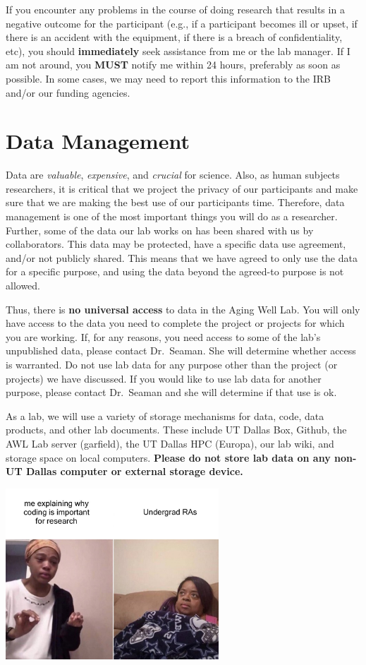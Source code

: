 \documentclass[]{book}
\begin{document}
If you encounter any problems in the course of doing research that results in a negative outcome for the participant (e.g., if a participant becomes ill or upset, if there is an accident with the equipment, if there is a breach of confidentiality, etc), you should \textbf{immediately} seek assistance from me or the lab manager. If I am not around, you \textbf{MUST} notify me within 24 hours, preferably as soon as possible. In some cases, we may need to report this information to the IRB and/or our funding agencies.

\hypertarget{data-management}{%
\chapter{Data Management}\label{data-management}}

Data are \emph{valuable}, \emph{expensive}, and \emph{crucial} for science. Also, as human subjects researchers, it is critical that we project the privacy of our participants and make sure that we are making the best use of our participants time. Therefore, data management is one of the most important things you will do as a researcher. Further, some of the data our lab works on has been shared with us by collaborators. This data may be protected, have a specific data use agreement, and/or not publicly shared. This means that we have agreed to only use the data for a specific purpose, and using the data beyond the agreed-to purpose is not allowed.

Thus, there is \textbf{no universal access} to data in the Aging Well Lab. You will only have access to the data you need to complete the project or projects for which you are working. If, for any reasons, you need access to some of the lab's unpublished data, please contact Dr.~Seaman. She will determine whether access is warranted. Do not use lab data for any purpose other than the project (or projects) we have discussed. If you would like to use lab data for another purpose, please contact Dr.~Seaman and she will determine if that use is ok.

As a lab, we will use a variety of storage mechanisms for data, code, data products, and other lab documents. These include UT Dallas Box, Github, the AWL Lab server (garfield), the UT Dallas HPC (Europa), our lab wiki, and storage space on local computers. \textbf{Please do not store lab data on any non-UT Dallas computer or external storage device.}

\includegraphics[width=0.6\textwidth,height=\textheight]{images/coding_meme.jpg}
\end{document}

